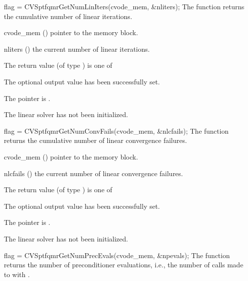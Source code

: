 {
  flag = CVSptfqmrGetNumLinIters(cvode\_mem, \&nliters);
}
{
  The function  returns the
  cumulative number of linear iterations.
}
{
  \begin{args}
  \item[cvode\_mem] ()
    pointer to the {\cvode} memory block.
  \item[nliters] ()
    the current number of linear iterations.
  \end{args}
}
{
  The return value  (of type ) is one of
  \begin{args}
  \item[\Id{CVSPTFQMR\_SUCCESS}] 
    The optional output value has been successfully set.
  \item[\Id{CVSPTFQMR\_MEM\_NULL}]
    The  pointer is .
  \item[\Id{CVSPTFQMR\_LMEM\_NULL}]
    The {\cvsptfqmr} linear solver has not been initialized.
  \end{args}
}
{}
{
  flag = CVSptfqmrGetNumConvFails(cvode\_mem, \&nlcfails);
}
{
  The function  returns the
  cumulative number of linear convergence failures.
}
{
  \begin{args}
  \item[cvode\_mem] ()
    pointer to the {\cvode} memory block.
  \item[nlcfails] ()
    the current number of linear convergence failures.
  \end{args}
}
{
  The return value  (of type ) is one of
  \begin{args}
  \item[\Id{CVSPTFQMR\_SUCCESS}] 
    The optional output value has been successfully set.
  \item[\Id{CVSPTFQMR\_MEM\_NULL}]
    The  pointer is .
  \item[\Id{CVSPTFQMR\_LMEM\_NULL}]
    The {\cvsptfqmr} linear solver has not been initialized.
  \end{args}
}
{}
{
  flag = CVSptfqmrGetNumPrecEvals(cvode\_mem, \&npevals);
}
{
  The function  returns the
  number of preconditioner evaluations, i.e., the number of 
  calls made to  with .
}
